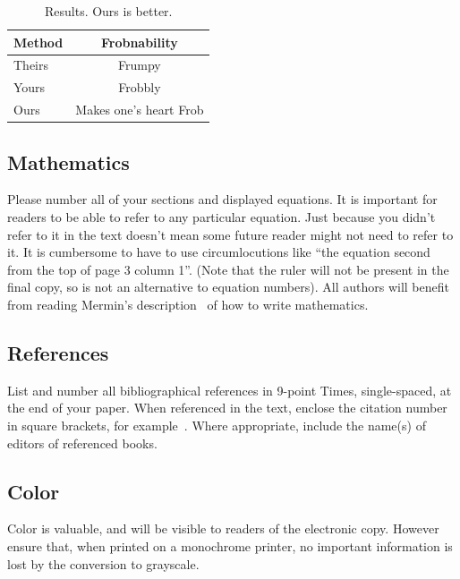 \documentclass{bmvc2k}
\begin{document}
\begin{table}
\begin{center}
\begin{tabular}{|l|c|}
\hline
Method & Frobnability \\
\hline\hline
Theirs & Frumpy \\
Yours & Frobbly \\
Ours & Makes one's heart Frob\\
\hline
\end{tabular}
\end{center}
\caption{Results.   Ours is better.}
\end{table}

\subsection{Mathematics}

Please number all of your sections and displayed equations.  It is
important for readers to be able to refer to any particular equation.  Just
because you didn't refer to it in the text doesn't mean some future reader
might not need to refer to it.  It is cumbersome to have to use
circumlocutions like ``the equation second from the top of page 3 column
1''.  (Note that the ruler will not be present in the final copy, so is not
an alternative to equation numbers).  All authors will benefit from reading
Mermin's description~\cite{Mermin89} of how to write mathematics.


\subsection{References}

List and number all bibliographical references in 9-point Times,
single-spaced, at the end of your paper. When referenced in the text,
enclose the citation number in square brackets, for
example~\cite{Authors06}.  Where appropriate, include the name(s) of
editors of referenced books.


\subsection{Color}

Color is valuable, and will be visible to readers of the electronic copy.
However ensure that, when printed on a monochrome printer, no important
information is lost by the conversion to grayscale.


\end{document}
